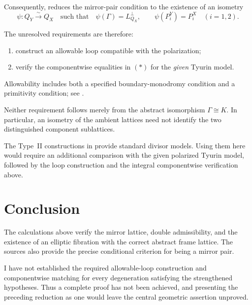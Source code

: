 \documentclass[11pt]{article}
\theoremstyle{remark}
\begin{document}
Consequently, \cite[Proposition~5.3]{GT24} reduces the mirror-pair
condition to the existence of an isometry
\[
 \psi:Q_Y\xrightarrow{\sim}Q_X
 \quad\text{such that}\quad
 \psi(\Gamma)=L^\perp_{Q_X},
 \qquad
 \psi(P_i^Y)=P_i^X\quad(i=1,2).
 \tag{*}
\]

The unresolved requirements are therefore:
\begin{enumerate}
 \item construct an allowable loop compatible with the polarization;
 \item verify the componentwise equalities in \((*)\) for the
       \emph{given} Tyurin model.
\end{enumerate}
Allowability includes both a specified boundary-monodromy condition
and a primitivity condition; see
\cite[Assumption~4.9 and Definition~4.11]{GT24}.

Neither requirement follows merely from the abstract isomorphism
\(\Gamma\cong K\).
In particular, an isometry of the ambient lattices need not identify
the two distinguished component sublattices.

The Type~II constructions in \cite[Section~7F]{ABE22} provide standard
divisor models.
Using them here would require an additional comparison with the
given polarized Tyurin model, followed by the loop construction and
the integral componentwise verification above.

\section*{Conclusion}

The calculations above verify the mirror lattice, double
admissibility, and the existence of an elliptic fibration with the
correct abstract frame lattice.  The sources also provide the precise
conditional criterion for being a mirror pair.

I have not established the required allowable-loop construction and
componentwise matching for every degeneration satisfying the
strengthened hypotheses.  Thus a complete proof has not been
achieved, and presenting the preceding reduction as one would leave
the central geometric assertion unproved.
\end{document}
